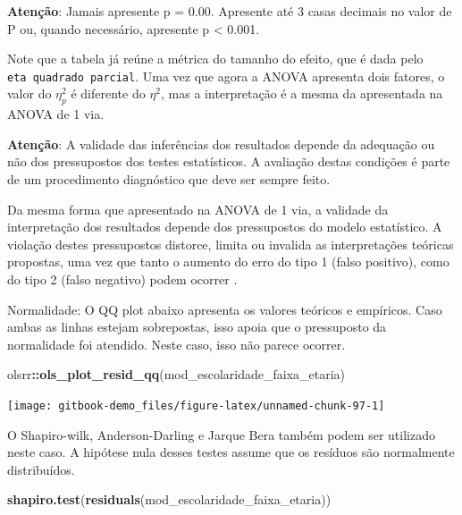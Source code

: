 \documentclass[
]{book}
\newenvironment{Shaded}{\begin{snugshade}}{\end{snugshade}}
\newcommand{\KeywordTok}[1]{\textcolor[rgb]{0.13,0.29,0.53}{\textbf{#1}}}
\newcommand{\NormalTok}[1]{#1}
\newcommand{\OperatorTok}[1]{\textcolor[rgb]{0.81,0.36,0.00}{\textbf{#1}}}
\begin{document}
\textbf{Atenção}: Jamais apresente p = 0.00. Apresente até 3 casas decimais no valor de P ou, quando necessário, apresente p \textless{} 0.001.

Note que a tabela já reúne a métrica do tamanho do efeito, que é dada pelo \texttt{eta\ quadrado\ parcial}. Uma vez que agora a ANOVA apresenta dois fatores, o valor do \(\eta_p^2\) é diferente do \(\eta^2\), mas a interpretação é a mesma da apresentada na ANOVA de 1 via.

\textbf{Atenção}: A validade das inferências dos resultados depende da adequação ou não dos pressupostos dos testes estatísticos. A avaliação destas condições é parte de um procedimento diagnóstico que deve ser sempre feito.

Da mesma forma que apresentado na ANOVA de 1 via, a validade da interpretação dos resultados depende dos pressupostos do modelo estatístico. A violação destes pressupostos distorce, limita ou invalida as interpretações teóricas propostas, uma vez que tanto o aumento do erro do tipo 1 (falso positivo), como do tipo 2 (falso negativo) podem ocorrer \citep{Lix1996, Barker2015, Ernst2017}.

Normalidade: O QQ plot abaixo apresenta os valores teóricos e empíricos. Caso ambas as linhas estejam sobrepostas, isso apoia que o pressuposto da normalidade foi atendido. Neste caso, isso não parece ocorrer.

\begin{Shaded}
\begin{Highlighting}[]
\NormalTok{olsrr}\OperatorTok{::}\KeywordTok{ols_plot_resid_qq}\NormalTok{(mod_escolaridade_faixa_etaria)}
\end{Highlighting}
\end{Shaded}

\begin{center}\texttt{[image: gitbook-demo\_files/figure-latex/unnamed-chunk-97-1]} \end{center}

O Shapiro-wilk, Anderson-Darling e Jarque Bera também podem ser utilizado neste caso. A hipótese nula desses testes assume que os resíduos são normalmente distribuídos.

\begin{Shaded}
\begin{Highlighting}[]
\KeywordTok{shapiro.test}\NormalTok{(}\KeywordTok{residuals}\NormalTok{(mod_escolaridade_faixa_etaria))}
\end{Highlighting}
\end{Shaded}
\end{document}
